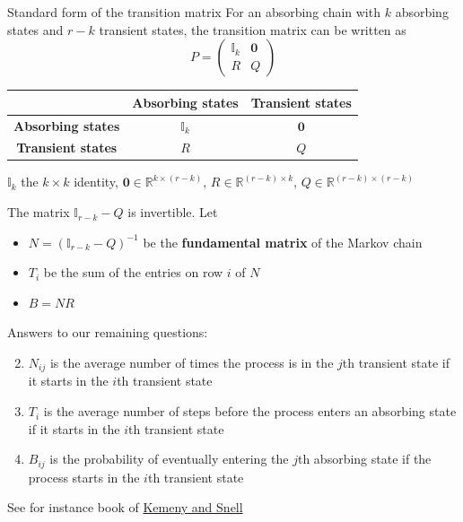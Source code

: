 \documentclass[aspectratio=43]{beamer}
\begin{document}
\begin{frame}{Standard form of the transition matrix}
    For an absorbing chain with $k$ absorbing states and $r-k$ transient states, the transition matrix can be written as
    $$
    P=\begin{pmatrix}
    \mathbb{I}_k & \mathbf{0} \\
    R & Q
    \end{pmatrix}
    $$
    
    \begin{center}
        \begin{tabular}{c|c|c|}
            & Absorbing states & Transient states \\
            \hline
            \textbf{Absorbing states} & $\mathbb{I}_k$ & $\mathbf{0}$ \\
            \textbf{Transient states} & $R$ & $Q$ 
        \end{tabular}
    \end{center}
    \vfill
    $\mathbb{I}_k$ the $k\times k$ identity, $\mathbf{0}\in\mathbb{R}^{k\times(r-k)}$, $R\in\mathbb{R}^{(r-k)\times k}$, $Q\in\mathbb{R}^{(r-k)\times(r-k)}$
\end{frame}


\begin{frame}
    The matrix $\mathbb{I}_{r-k}-Q$ is invertible. Let
\begin{itemize}
    \item $N=(\mathbb{I}_{r-k}-Q)^{-1}$ be the \textbf{fundamental matrix} of the Markov chain
    \item $T_i$ be the sum of the entries on row $i$ of $N$
    \item $B=NR$
\end{itemize}
\vfill
Answers to our remaining questions:

\begin{enumerate}
    \setcounter{enumi}{1}
    \item $N_{ij}$ is the average number of times the process is in the $j$th transient state if it starts in the $i$th transient state
    \item $T_i$ is the average number of steps before the process enters an absorbing state if it starts in the $i$th transient state
    \item $B_{ij}$ is the probability of eventually entering the $j$th absorbing state if the process starts in the $i$th transient state
\end{enumerate}
\vfill
See for instance book of \href{https://www.amazon.com/Finite-Markov-Chains-Laurie-Kemeny/dp/B000KYES0O}{Kemeny and Snell}
\end{frame}
\end{document}
